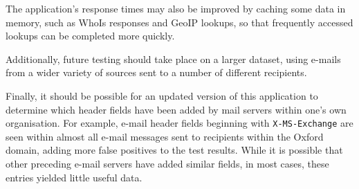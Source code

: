 The application's response times may also be improved by caching some data in
memory, such as WhoIs responses and GeoIP lookups, so that frequently accessed
lookups can be completed more quickly.

Additionally, future testing should take place on a larger dataset, using
e-mails from a wider variety of sources sent to a number of different
recipients.  

Finally, it should be possible for an updated version of this application to
determine which header fields have been added by mail servers within one's own
organisation.  For example, e-mail header fields beginning with
\texttt{X-MS-Exchange} are seen within almost all e-mail messages sent to
recipients within the Oxford domain, adding more false positives to the test
results. While it is possible that other preceding e-mail servers have added
similar fields, in most cases, these entries yielded little useful data.

